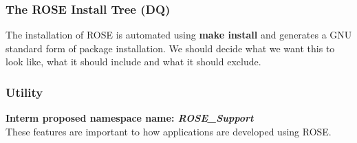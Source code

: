 \subsubsection{The ROSE Install Tree (DQ)}
   The installation of ROSE is automated using {\bf make install}
and generates a GNU standard form of package installation.  
We should decide what we want this to look like, what it should include
and what it should exclude.


\subsubsection{Utility}
{\bf Interm proposed namespace name: {\em ROSE\_Support}} \\
   These features are important to how applications are developed using ROSE.


